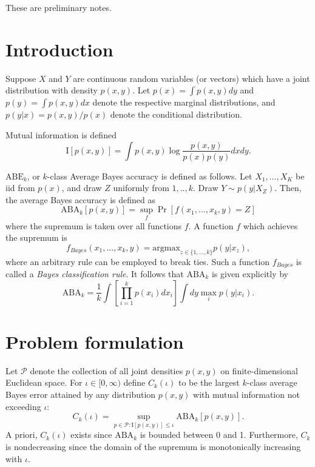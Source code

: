 \documentclass[12pt]{article}
\begin{document}
\maketitle

\newcommand{\tr}{\text{tr}}
\newcommand{\E}{\textbf{E}}
\newcommand{\diag}{\text{diag}}
\newcommand{\argmax}{\text{argmax}}
\newcommand{\Cov}{\text{Cov}}
\newcommand{\Var}{\text{Var}}
\newcommand{\argmin}{\text{argmin}}
\newcommand{\Vol}{\text{Vol}}
\newcommand{\comm}[1]{}

These are preliminary notes.

\section{Introduction}

Suppose $X$ and $Y$ are continuous random variables (or vectors) which have a joint distribution with density $p(x, y)$.
Let $p(x) = \int p(x,y) dy$ and $p(y) = \int p(x,y) dx$ denote the respective marginal distributions,
and $p(y|x) = p(x,y)/p(x)$ denote the conditional distribution.

Mutual information is defined
\[
\text{I}[p(x, y)] = \int p(x, y) \log \frac{p(x, y)}{p(x)p(y)} dx dy.
\]

$\text{ABE}_k$, or $k$-class Average Bayes accuracy is defined as follows.  Let $X_1,...,X_K$ be iid from $p(x)$,
and draw $Z$ uniformly from $1,..,k$.  Draw $Y \sim p(y|X_Z)$.
Then, the average Bayes accuracy is defined as
\[
\text{ABA}_k[p(x, y)] = \sup_f \Pr[f(x_1,...,x_k, y) = Z] 
\]
where the supremum is taken over all functions $f$.  A function $f$ which achieves the supremum is
\[
f_{Bayes}(x_1,...,x_k, y) = \text{argmax}_{z \in \{1,...,k\}} p(y|x_z),
\]
where an arbitrary rule can be employed to break ties.
Such a function $f_{Bayes}$ is called a \emph{Bayes classification rule}.
It follows that $\text{ABA}_k$ is given explicitly by
\[
\text{ABA}_k = \frac{1}{k} \int \left[\prod_{i=1}^k p(x_i) dx_i \right] \int dy \max_i p(y|x_i).
\]

\section{Problem formulation}

Let $\mathcal{P}$ denote the collection of all joint densities $p(x,
y)$ on finite-dimensional Euclidean space.  For $\iota \in [0,\infty)$
define $C_k(\iota)$ to be the largest $k$-class average Bayes error
attained by any distribution $p(x,y)$ with mutual information not
exceeding $\iota$:
\[
C_k(\iota) = \sup_{p \in \mathcal{P}: \text{I}[p(x,y)] \leq \iota} \text{ABA}_k[p(x,y)].
\]
A priori, $C_k(\iota)$ exists since $\text{ABA}_k$ is bounded between
0 and 1.  Furthermore, $C_k$ is nondecreasing since the domain of the
supremum is monotonically increasing with $\iota$.
\end{document}
